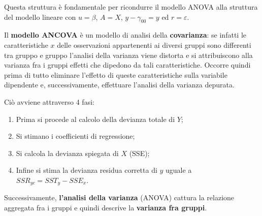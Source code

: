 \documentclass[a4page, 11pt]{article} %
\begin{document}
Questa struttura è fondamentale per ricondurre il modello ANOVA alla struttura del modello lineare con $u = \beta$, $A = X$, $y-\gamma_{00}=y$ ed $r = \varepsilon$.

Il \textbf{modello ANCOVA} è un modello di analisi della \textbf{covarianza}: se infatti le caratteristiche $x$ delle osservazioni appartenenti ai diversi gruppi sono differenti tra gruppo e gruppo l'analisi della varianza viene distorta e si attribuiscono alla varianza fra i gruppi effetti che dipedono da tali caratteristiche. Occorre quindi prima di tutto eliminare l'effetto di queste caratteristiche sulla variabile dipendente e, successivamente, effettuare l'analisi della varianza depurata.

Ciò avviene attraverso 4 fasi:
\begin{enumerate}
\item Prima si procede al calcolo della devianza totale di $Y$;
\item Si stimano i coefficienti di regressione;
\item Si calcola la devianza spiegata di $X$ (SSE);
\item Infine si stima la devianza residua corretta di $y$ uguale a $SSR_{yc}=SST_y - SSE_x$.
\end{enumerate}
Successivamente, \textbf{l’analisi della varianza} (ANOVA) cattura la relazione aggregata fra i gruppi e quindi descrive la \textbf{varianza fra gruppi}.
\end{document}

